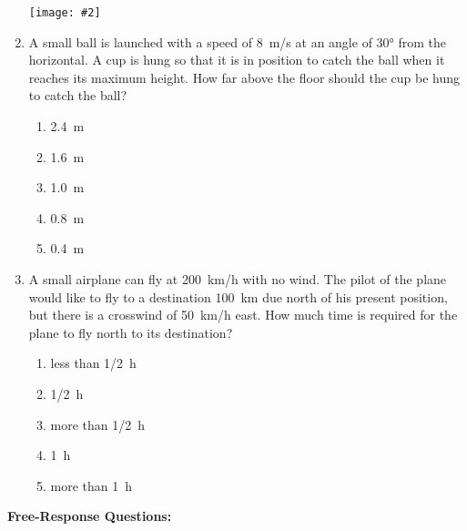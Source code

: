 \documentclass[12pt]{article}
\newcommand{\pic}[2]{\texttt{[image: \#2]}}
\begin{document}
\begin{enumerate}[leftmargin=50pt,label=\underline{\hspace{0.4in}} \arabic*.]
 \vspace{-.45in}\begin{center}
   \pic{.45}{cup.png}
 \end{center}

\item\vspace{-.2in}A small ball is launched with a speed of \SI{8}{m/s} at an angle of
  \ang{30} from the horizontal. A cup is hung so that it is in position to
  catch the ball when it reaches its maximum height. How far above the floor
  should the cup be hung to catch the ball?
  \begin{enumerate}[noitemsep,topsep=0pt]
  \item\SI{2.4}{\metre}
  \item\SI{1.6}{\metre}
  \item\SI{1.0}{\metre}
  \item\SI{0.8}{\metre}
  \item\SI{0.4}{\metre}
  \end{enumerate}

\item A small airplane can fly at \SI{200}{km/h} with no wind. The pilot of the
  plane would like to fly to a destination \SI{100}{\km} due north of his
  present position, but there is a crosswind of \SI{50}{km/h} east. How much
  time is required for the plane to fly north to its destination?
  \begin{enumerate}[noitemsep,topsep=0pt]
  \item less than \SI{1/2}{h}
  \item \SI{1/2}{h}
  \item more than \SI{1/2}{h}
  \item \SI{1}{h}
  \item more than \SI{1}{h}
  \end{enumerate}

\end{enumerate}

\newpage
\noindent\textbf{Free-Response Questions:}
\end{document}
